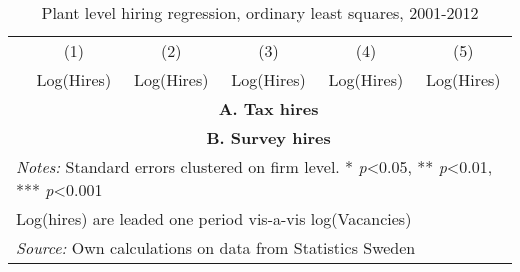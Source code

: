 \begin{table}[htbp]\centering
\def\sym#1{\ifmmode^{#1}\else\(^{#1}\)\fi}
\caption{Plant level hiring regression, ordinary least squares, 2001-2012}
\label{tab:main_ols}
\begin{tabular}{l*{5}{c}}
\hline\hline
                &\multicolumn{1}{c}{(1)}&\multicolumn{1}{c}{(2)}&\multicolumn{1}{c}{(3)}&\multicolumn{1}{c}{(4)}&\multicolumn{1}{c}{(5)}\\
                &\multicolumn{1}{c}{Log(Hires)}&\multicolumn{1}{c}{Log(Hires)}&\multicolumn{1}{c}{Log(Hires)}&\multicolumn{1}{c}{Log(Hires)}&\multicolumn{1}{c}{Log(Hires)}\\
\hline

\hline
			    &\multicolumn{5}{c}{\textbf{A. Tax hires}} \\
\hline


\hline 

\hline

\hline
			    &\multicolumn{5}{c}{\textbf{B. Survey hires}} \\
\hline



\hline 


\hline\hline
\multicolumn{6}{l}{\footnotesize \emph{Notes:} Standard errors clustered on firm level. * \emph{p}<0.05, ** \emph{p}<0.01, *** \emph{p}<0.001}\\
\multicolumn{6}{l}{\footnotesize Log(hires) are leaded one period vis-a-vis log(Vacancies)}\\
\multicolumn{6}{l}{\footnotesize \emph{Source:} Own calculations on data from Statistics Sweden}\\
\end{tabular}
\end{table}